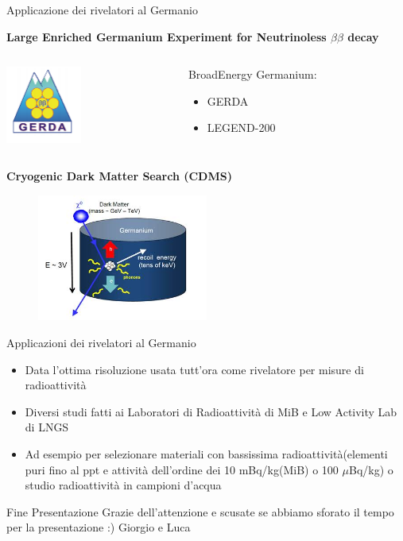 \documentclass{beamer}
\begin{document}
\begin{frame}{Applicazione dei rivelatori al Germanio}
    
    \textbf{Large Enriched Germanium Experiment for Neutrinoless $\beta \beta$ decay}
       \begin{columns}
           \begin{column}{0.4\textwidth}
              \includegraphics[width=2.5cm]{images/gerda.PNG}
           \end{column}
           \begin{column}{0.4\textwidth}
           BroadEnergy Germanium: 
           \begin{itemize}
           \item GERDA 
           \item LEGEND-200
           \end{itemize}
           \end{column}
        \end{columns}
        
    \textbf{Cryogenic Dark Matter Search (CDMS)}
    \begin{figure}
    \centering
    \includegraphics[width=5.6cm]{images/cdms.png}
\end{figure}
    \end{frame}
    
\begin{frame}{Applicazioni dei rivelatori al Germanio}
    \begin{itemize}
        \item Data l'ottima risoluzione usata tutt'ora come rivelatore per misure di radioattività
        \item Diversi studi fatti ai Laboratori di Radioattività di MiB e Low Activity Lab di LNGS
        \item Ad esempio per selezionare materiali con bassissima radioattività(elementi puri fino al ppt e attività dell'ordine dei 10 mBq/kg(MiB) o 100 $\mu$Bq/kg)  o studio radioattività in campioni d'acqua
    \end{itemize}
\end{frame}

\begin{frame}{Fine Presentazione}
    Grazie dell'attenzione e scusate se abbiamo sforato il tempo per la presentazione
    :)
    \vfill
    Giorgio e Luca
    
    
\end{frame}
\end{document}
